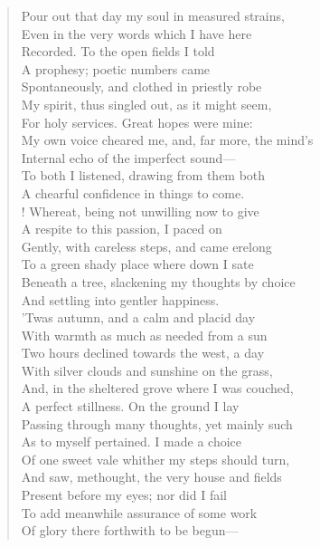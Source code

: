 \begin{verse}
Pour out that day my soul in measured strains,  \\
Even in the very words which I have here  \\
Recorded. To the open fields I told  \\
A prophesy; poetic numbers came	  \\
Spontaneously, and clothed in priestly robe  \\
My spirit, thus singled out, as it might seem,  \\
For holy services. Great hopes were mine:  \\
My own voice cheared me, and, far more, the mind's  \\
Internal echo of the imperfect sound---	  \\
To both I listened, drawing from them both  \\
A chearful confidence in things to come.  \\!
Whereat, being not unwilling now to give  \\
A respite to this passion, I paced on  \\
Gently, with careless steps, and came erelong	  \\
To a green shady place where down I sate  \\
Beneath a tree, slackening my thoughts by choice  \\
And settling into gentler happiness.  \\
'Twas autumn, and a calm and placid day  \\
With warmth as much as needed from a sun	  \\
Two hours declined towards the west, a day  \\
With silver clouds and sunshine on the grass,  \\
And, in the sheltered grove where I was couched,  \\
A perfect stillness. On the ground I lay  \\
Passing through many thoughts, yet mainly such	  \\
As to myself pertained. I made a choice  \\
Of one sweet vale whither my steps should turn,  \\
And saw, methought, the very house and fields  \\
Present before my eyes; nor did I fail  \\
To add meanwhile assurance of some work	  \\
Of glory there forthwith to be begun---  \\

\end{verse}
